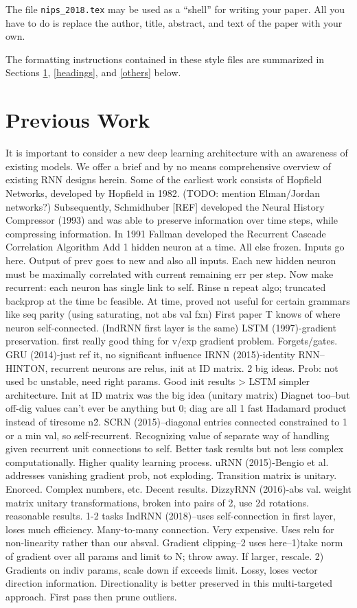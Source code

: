 \documentclass{article}
\begin{document}
The file \verb+nips_2018.tex+ may be used as a ``shell'' for writing
your paper. All you have to do is replace the author, title, abstract,
and text of the paper with your own.

The formatting instructions contained in these style files are
summarized in Sections \ref{gen_inst}, \ref{headings}, and
\ref{others} below.

\section{Previous Work}
\label{gen_inst}
It is important to consider a new deep learning architecture with an awareness of existing models.  We offer a brief and by no means comprehensive overview of existing RNN designs herein.  Some of the earliest work consists of Hopfield Networks, developed by Hopfield in 1982. (TODO: mention Elman/Jordan networks?) Subsequently, Schmidhuber [REF] developed the Neural History Compressor (1993) and was able to preserve information over time steps, while compressing information.  In 1991 Fallman developed the Recurrent Cascade Correlation Algorithm \citet{Fahlman1990TheRC}
Add 1 hidden neuron at a time.  All else frozen.  Inputs go here.  Output of prev goes to new and also all inputs. Each new hidden neuron must be maximally correlated with current remaining err per step.  Now make recurrent: each neuron has single link to self.  Rinse n repeat algo; truncated backprop at the time bc feasible.  At time, proved not useful for certain grammars like seq parity (using saturating, not abs val fxn) First paper T knows of where neuron self-connected. (IndRNN first layer is the same)
LSTM (1997)-gradient preservation. first really good thing for v/exp gradient problem.  Forgets/gates. 
GRU (2014)-just ref it, no significant influence
IRNN (2015)-identity RNN--HINTON, recurrent neurons are relus, init at ID matrix. 2 big ideas. Prob: not used bc unstable, need right params.  Good init results > LSTM simpler architecture. Init at ID matrix was the big idea (unitary matrix) Diagnet too--but off-dig values can't ever be anything but 0; diag are all 1 fast Hadamard product instead of tiresome n\^2.
SCRN (2015)--diagonal entries connected constrained to 1 or a min val, so self-recurrent.  Recognizing value of separate way of handling given recurrent unit connections to self.  Better task results but not less complex computationally. Higher quality learning process.
uRNN (2015)-Bengio et al.  addresses vanishing gradient prob, not exploding.  Transition matrix is unitary.  Enorced.  Complex numbers, etc. Decent results.
DizzyRNN (2016)-abs val. weight matrix unitary transformations, broken into pairs of 2, use 2d rotations. reasonable results. 1-2 tasks 
IndRNN  (2018)--uses self-connection in first layer, loses much efficiency.  Many-to-many connection. Very expensive.  Uses relu for non-linearity rather than our absval.  
Gradient clipping--2 uses here--1)take norm of gradient over all params and limit to N; throw away.  If larger, rescale.  2) Gradients on indiv params, scale down if exceeds limit.  Lossy, loses vector direction information. Directionality is better preserved in this multi-targeted approach. First pass then prune outliers.    
\end{document}
